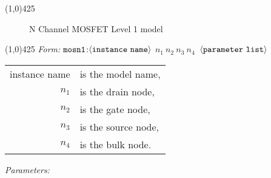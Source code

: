 \documentclass{article}
\newcommand{\FDA}{FreeDa}
\begin{document}
{}
\linethickness{1mm}
\line(1,0){425}
\normalsize
\begin{figure}[h]
\centerline{\epsfxsize=4in} \caption{N Channel MOSFET
Level 1 model}
\end{figure}
\linethickness{0.5mm} \line(1,0){425}
\newline
\textit{Form:}
\newline
$\tt mosn1$:$\langle \tt{instance\ name}\rangle$ $n_1\ n_2\ n_3\
n_4\ $ $\langle \tt{parameter\ list}\rangle$
\newline
\begin{tabular}{r l}
instance name & is the model name, \\
$n_1$ & is the drain node, \\
$n_2$ & is the gate node, \\
$n_3$ & is the source node, \\
$n_4$ & is the bulk node. \\
\end{tabular}
\newline
\textit{Parameters:}
\end{document}

